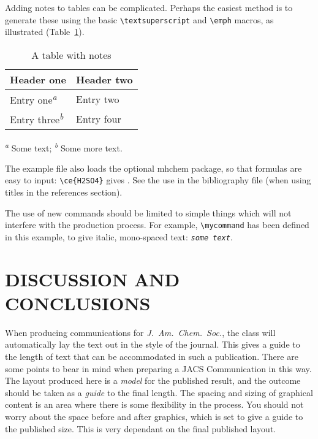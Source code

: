 \documentclass[journal=jctc, manuscript=article]{achemso}
\newcommand*\mycommand[1]{\texttt{\emph{#1}}}
\begin{document}
Adding notes to tables can be complicated.  Perhaps the easiest
method is to generate these using the basic
\texttt{\textbackslash textsuperscript} and
\texttt{\textbackslash emph} macros, as illustrated (Table~\ref{tbl:notes}).
\begin{table}
  \caption{A table with notes}
  \label{tbl:notes}
  \begin{tabular}{ll}
    \hline
    Header one                            & Header two \\
    \hline
    Entry one\textsuperscript{\emph{a}}   & Entry two  \\
    Entry three\textsuperscript{\emph{b}} & Entry four \\
    \hline
  \end{tabular}

  \textsuperscript{\emph{a}} Some text;
  \textsuperscript{\emph{b}} Some more text.
\end{table}

The example file also loads the optional \textsf{mhchem} package, so
that formulas are easy to input: \texttt{\textbackslash ce\{H2SO4\}}
gives .  See the use in the bibliography file (when using
titles in the references section).

The use of new commands should be limited to simple things which will
not interfere with the production process.  For example,
\texttt{\textbackslash mycommand} has been defined in this example,
to give italic, mono-spaced text: \mycommand{some text}.






\section{DISCUSSION AND CONCLUSIONS}

When producing communications for \emph{J.~Am.\ Chem.\ Soc.}, the
class will automatically lay the text out in the style of the
journal. This gives a guide to the length of text that can be
accommodated in such a publication. There are some points to bear in
mind when preparing a JACS Communication in this way.  The layout
produced here is a \emph{model} for the published result, and the
outcome should be taken as a \emph{guide} to the final length. The
spacing and sizing of graphical content is an area where there is
some flexibility in the process.  You should not worry about the
space before and after graphics, which is set to give a guide to the
published size. This is very dependant on the final published layout.
\end{document}
